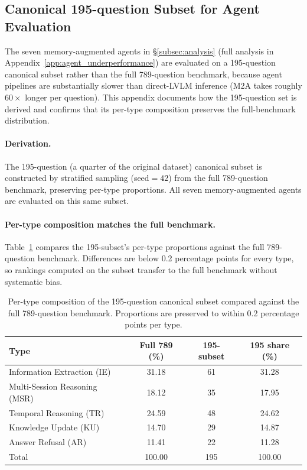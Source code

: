 \documentclass{article}
\begin{document}
\subsection{Canonical 195-question Subset for Agent Evaluation}
\label{app:canonical195}

The seven memory-augmented agents in \S\ref{subsec:analysis} (full analysis in Appendix~\ref{app:agent_underperformance}) are evaluated on a 195-question canonical subset rather than the full 789-question benchmark, because agent pipelines are substantially slower than direct-LVLM inference (M2A takes roughly $60{\times}$ longer per question). This appendix documents how the 195-question set is derived and confirms that its per-type composition preserves the full-benchmark distribution.

\paragraph{Derivation.}
The 195-question (a quarter of the original dataset) canonical subset is constructed by stratified sampling (seed${=}42$) from the full 789-question benchmark, preserving per-type proportions. All seven memory-augmented agents are evaluated on this same subset.

\paragraph{Per-type composition matches the full benchmark.}
Table~\ref{tab:canonical195_strat} compares the 195-subset's per-type proportions against the full 789-question benchmark. Differences are below 0.2 percentage points for every type, so rankings computed on the subset transfer to the full benchmark without systematic bias.

\begin{table}[h]
\centering
\small
\caption{Per-type composition of the 195-question canonical subset compared against the full 789-question benchmark. Proportions are preserved to within 0.2 percentage points per type.}
\label{tab:canonical195_strat}
\begin{tabular}{@{}lccc@{}}
\toprule
Type & Full 789 (\%) & 195-subset & 195 share (\%) \\
\midrule
Information Extraction (IE)      & 31.18 & 61 & 31.28 \\
Multi-Session Reasoning (MSR)    & 18.12 & 35 & 17.95 \\
Temporal Reasoning (TR)          & 24.59 & 48 & 24.62 \\
Knowledge Update (KU)            & 14.70 & 29 & 14.87 \\
Answer Refusal (AR)              & 11.41 & 22 & 11.28 \\
\midrule
Total                            & 100.00 & 195 & 100.00 \\
\bottomrule
\end{tabular}
\end{table}
\end{document}
